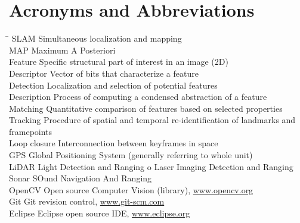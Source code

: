 \section*{Acronyms and Abbreviations}
\label{sec:acronyms}
\begin{tabbing}
	\hspace*{3.5cm}		\= \kill
	SLAM \> Simultaneous localization and mapping \\[1ex]
    MAP \> Maximum A Posteriori \\[1ex]
	Feature \> Specific structural part of interest in an image (2D) \\[1ex]
	Descriptor \> Vector of bits that characterize a feature \\[1ex]
	Detection \> Localization and selection of potential features \\[1ex]
	Description \> Process of computing a condensed abstraction of a feature \\[1ex]
	Matching \> Quantitative comparison of features based on selected properties \\[1ex]
	Tracking \> Procedure of spatial and temporal re-identification of landmarks and framepoints \\[1ex]
	Loop closure \> Interconnection between keyframes in space \\[1ex]
	GPS \> Global Positioning System (generally referring to whole unit) \\[1ex]
    LiDAR \> Light Detection and Ranging o Laser Imaging Detection and Ranging \\[1ex]
    Sonar \> SOund Navigation And Ranging \\[1ex]
	OpenCV  \> Open source Computer Vision (library), \url{www.opencv.org} \\[1ex]
	Git  \> Git revision control, \url{www.git-scm.com} \\[1ex]
	Eclipse \> Eclipse open source IDE, \url{www.eclipse.org}
\end{tabbing}